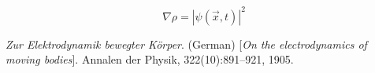 \documentclass[usenatbib]{mn2e}
\begin{document}
\begin{equation} \label{eq2}
\nabla \rho =\left| \psi\left( \overrightarrow {x},t\right) \right| ^{2}
\end{equation}






\def\aap{A\&A}
\def\araa{ARA\&A}
\def\apjl{APJL}
\def\mnras{MNRAS}
\def\nat{Nature}



\begin{thebibliography}
\textit{Zur Elektrodynamik bewegter K{\"o}rper}. (German) 
[\textit{On the electrodynamics of moving bodies}]. 
Annalen der Physik, 322(10):891–921, 1905.
\end{thebibliography}
\end{document}
